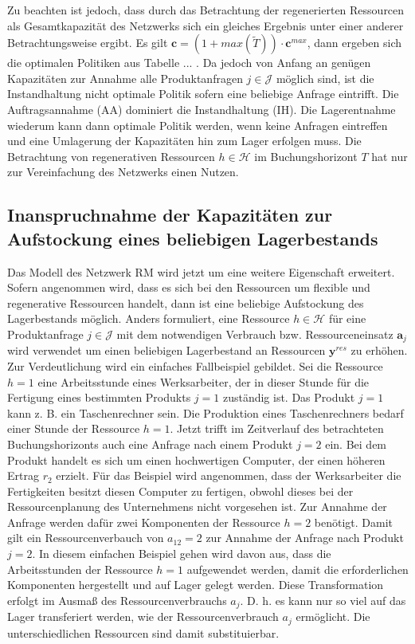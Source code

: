 Zu beachten ist jedoch, dass durch das Betrachtung der regenerierten Ressourcen als Gesamtkapazität des Netzwerks sich ein gleiches Ergebnis unter einer anderer Betrachtungsweise ergibt. Es gilt $\textbf{c}=(1+max(\tilde{T}))\cdot \textbf{c}^{max}$, dann ergeben sich die optimalen Politiken aus Tabelle ... . Da jedoch von Anfang an genügen Kapazitäten zur Annahme alle Produktanfragen $j\in\mathcal{J}$ möglich sind, ist die Instandhaltung nicht optimale Politik sofern eine beliebige Anfrage eintrifft. Die Auftragsannahme (AA) dominiert die Instandhaltung (IH). Die Lagerentnahme wiederum kann dann optimale Politik werden, wenn keine Anfragen eintreffen und eine Umlagerung der Kapazitäten hin zum Lager erfolgen muss. Die Betrachtung von regenerativen Ressourcen $h\in\mathcal{H}$ im Buchungshorizont $T$ hat nur zur Vereinfachung des Netzwerks einen Nutzen.



\subsection{Inanspruchnahme der Kapazitäten zur Aufstockung eines beliebigen Lagerbestands}

Das Modell des Netzwerk RM wird jetzt um eine weitere Eigenschaft erweitert. Sofern angenommen wird, dass es sich bei den Ressourcen um flexible und regenerative Ressourcen handelt, dann ist eine beliebige Aufstockung des Lagerbestands möglich. Anders formuliert, eine Ressource $h\in\mathcal{H}$ für eine Produktanfrage $j\in\mathcal{J}$ mit dem notwendigen Verbrauch bzw. Ressourceneinsatz $\textbf{a}_j$ wird verwendet um einen beliebigen Lagerbestand an Ressourcen $\textbf{y}^{res}$ zu erhöhen. Zur Verdeutlichung wird ein einfaches Fallbeispiel gebildet. Sei die Ressource $h=1$ eine Arbeitsstunde eines Werksarbeiter, der in dieser Stunde für die Fertigung eines bestimmten Produkts $j=1$ zuständig ist. Das Produkt $j=1$ kann z. B. ein Taschenrechner sein. Die Produktion eines Taschenrechners bedarf einer Stunde der Ressource $h=1$. Jetzt trifft im Zeitverlauf des betrachteten Buchungshorizonts auch eine Anfrage nach einem Produkt $j=2$ ein. Bei dem Produkt handelt es sich um einen hochwertigen Computer, der einen höheren Ertrag $r_{2}$ erzielt. Für das Beispiel wird angenommen, dass der Werksarbeiter die Fertigkeiten besitzt diesen Computer zu fertigen, obwohl dieses bei der Ressourcenplanung des Unternehmens nicht vorgesehen ist. Zur Annahme der Anfrage werden dafür zwei Komponenten der Ressource $h=2$ benötigt. Damit gilt ein Ressourcenverbauch von $a_12=2$ zur Annahme der Anfrage nach Produkt $j=2$. In diesem einfachen Beispiel gehen wird davon aus, dass die Arbeitsstunden der Ressource $h=1$ aufgewendet werden, damit die erforderlichen Komponenten hergestellt und auf Lager gelegt werden. Diese Transformation erfolgt im Ausmaß des Ressourcenverbrauchs $a_{j}$. D. h. es kann nur so viel auf das Lager transferiert werden, wie der Ressourcenverbrauch $a_{j}$ ermöglicht. Die unterschiedlichen Ressourcen sind damit substituierbar.

